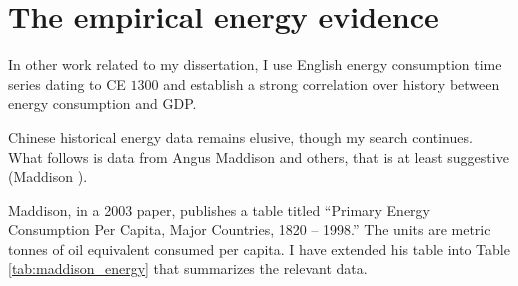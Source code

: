 \documentclass[12pt]{article}
\numberwithin{equation}{section}
\begin{document}
\begin{comment}
			\subsubsection{England}
			\subsubsection{China}
		\subsection{What did they expect?}
		
		\subsection{the cottrell theory}
			
	\section{Literature Review}
	Karl Marx\\
	Fred Cottrel\\
	R. Bin Wong\\
	\section{Discussion}
\end{comment}

	\section*{The empirical energy evidence}
	
	In other work related to my dissertation, I use English energy consumption time series dating to CE $1300$ and establish a strong correlation over history between energy consumption and GDP.
	
	Chinese historical energy data remains elusive, though my search continues. What follows is data from Angus Maddison and others, that is at least suggestive (Maddison \citeyear[p.~10]{maddison_growth_2003}).
	
	Maddison, in a 2003 paper, publishes a table titled ``Primary Energy Consumption Per Capita, Major Countries, 1820 -- 1998.'' The units are metric tonnes of oil equivalent consumed per capita. I have extended his table into Table \ref{tab:maddison_energy} that summarizes the relevant data.
\end{document}
